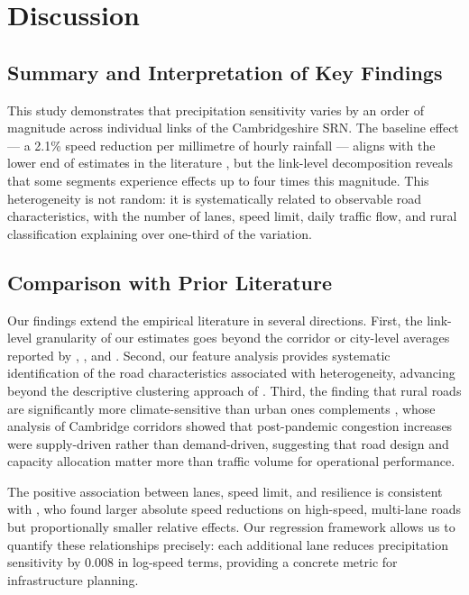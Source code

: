 \documentclass[review]{elsarticle}
\begin{document}
\section{Discussion}
\label{sec:discussion}

\subsection{Summary and Interpretation of Key Findings}
\label{sec:disc:summary}

This study demonstrates that precipitation sensitivity varies by an order of magnitude across individual links of the Cambridgeshire SRN. The baseline effect --- a 2.1\% speed reduction per millimetre of hourly rainfall --- aligns with the lower end of estimates in the literature \citep{hranac2006empirical}, but the link-level decomposition reveals that some segments experience effects up to four times this magnitude. This heterogeneity is not random: it is systematically related to observable road characteristics, with the number of lanes, speed limit, daily traffic flow, and rural classification explaining over one-third of the variation.

\subsection{Comparison with Prior Literature}
\label{sec:disc:lit}

Our findings extend the empirical literature in several directions. First, the link-level granularity of our estimates goes beyond the corridor or city-level averages reported by \citet{hranac2006empirical}, \citet{becker2026rainfall}, and \citet{bi2022weather}. Second, our feature analysis provides systematic identification of the road characteristics associated with heterogeneity, advancing beyond the descriptive clustering approach of \citet{gao2024resilience}. Third, the finding that rural roads are significantly more climate-sensitive than urban ones complements \citet{wan2024paradox}, whose analysis of Cambridge corridors showed that post-pandemic congestion increases were supply-driven rather than demand-driven, suggesting that road design and capacity allocation matter more than traffic volume for operational performance.

The positive association between lanes, speed limit, and resilience is consistent with \citet{becker2026rainfall}, who found larger absolute speed reductions on high-speed, multi-lane roads but proportionally smaller relative effects. Our regression framework allows us to quantify these relationships precisely: each additional lane reduces precipitation sensitivity by 0.008 in log-speed terms, providing a concrete metric for infrastructure planning.
\end{document}
